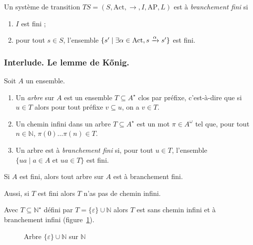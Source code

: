 \documentclass[./main]{subfiles}
\begin{document}
  \begin{defn}
    Un système de transition $TS = (S, \mathrm{Act}, {\to}, I,  \mathrm{AP}, L)$ est à \textit{branchement fini} si
    \begin{enumerate}
      \item $I$ est fini ;
      \item pour tout $s \in S$, l'ensemble $\{s'  \mid \exists \alpha \in \mathrm{Act}, s \mathrel{\xrightarrow{\alpha}} s'\} $ est fini.
    \end{enumerate}
  \end{defn}

  \subsubsection{Interlude. Le lemme de Kőnig.}

  \begin{defn}
    Soit $A$ un ensemble.
    \begin{enumerate}
      \item Un \textit{arbre} sur $A$ est un ensemble $T \subseteq A^\star$ clos par préfixe, c'est-à-dire que si $u \in T$ alors pour tout préfixe $v \subseteq u$, on a $v \in T$.
      \item Un chemin infini dans un arbre $T \subseteq A^\star$ est un mot $\pi \in A^\omega$ tel que, pour tout $n \in \mathds{N}$, $\pi(0)\ldots \pi(n) \in T$.
      \item Un arbre est à \textit{branchement fini} si, pour tout $u \in T$, l'ensemble $\{ua  \mid a \in A \text{ et } ua \in T\}$ est fini.
    \end{enumerate}
  \end{defn}

  \begin{rmk}
    Si $A$ est fini, alors tout arbre sur $A$ est à branchement fini.
    
    Aussi, si $T$ est fini alors $T$ n'as pas de chemin infini.
  \end{rmk}

  \begin{exm}
    Avec $T \subseteq \mathds{N}^\star$ défini par $T = \{\varepsilon\} \cup \mathds{N}$ alors $T$ est sans chemin infini et à branchement infini (figure~\ref{fig:tree-N}).
  \end{exm}

  \begin{figure}
    \centering
    \caption{Arbre $\{\varepsilon\} \cup \mathds{N}$ sur $\mathds{N}$}
    \label{fig:tree-N}
  \end{figure}
\end{document}
